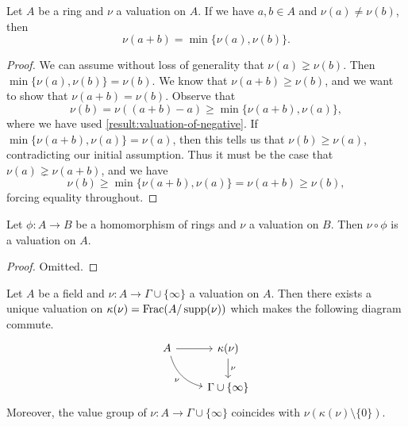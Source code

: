 \begin{lemma}
\label{result:strong-triangle-inequality-strengthening}
Let $A$ be a ring and $\nu$ a valuation on $A$. If we have $a, b \in A$ and $\nu(a) \neq \nu(b)$, then 
\[ \nu(a+b) = \min\{\nu(a),  \nu(b)\}. \]
\end{lemma}

\begin{proof}
We can assume without loss of generality that $\nu(a) \gneq \nu(b)$. Then $\min\{\nu(a), \nu(b)\} = \nu(b)$. We know that $\nu(a+b) \geq \nu(b)$, and we want to show that $\nu(a+b) = \nu(b)$. Observe that
\[ \nu(b) = \nu((a+b) - a) \geq \min\{ \nu(a+b), \nu(a) \}, \]
where we have used \cref{result:valuation-of-negative}.
If $\min\{ \nu(a+b), \nu(a)\} = \nu(a)$, then this tells us that $\nu(b) \geq \nu(a)$, contradicting our initial assumption. Thus it must be the case that $\nu(a) \gneq \nu(a+b)$, and we have
\[ \nu(b) \geq \min\{ \nu(a+b), \nu(a) \} = \nu(a+b) \geq \nu(b), \]
forcing equality throughout. 
\end{proof}

\begin{lemma}
\label{result:pullback-valuation}
Let $\phi : A \to B$ be a homomorphism of rings and $\nu$ a valuation on $B$. Then $\nu \circ \phi$ is a valuation on $A$. 
\end{lemma}

\begin{proof}
Omitted. 
\end{proof}

\begin{lemma}
\label{result:valuation-unique-extension-residue-field}
Let $A$ be a field and $\nu : A \to \Gamma \cup \{\infty\}$ a valuation on $A$. Then there exists a unique valuation on $\kappa(\nu) = \operatorname{Frac}(A/\operatorname{supp}(\nu))$ which makes the following diagram commute. 
\[ \begin{tikzcd} A \ar{r} \ar[bend right]{dr}[swap]{\nu} & \kappa(\nu) \ar{d}{\nu} \\ & \Gamma  \cup \{\infty\} \end{tikzcd} \]
Moreover, the value group of $\nu : A \to \Gamma \cup \{\infty\}$ coincides with $\nu(\kappa(\nu) \setminus \{0\})$. 
\end{lemma}

